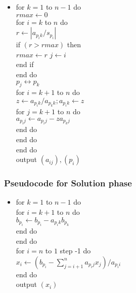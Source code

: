 \documentclass[notheorems,mathserif,table,compress]{beamer}  %
\begin{document}
\begin{frame}
\begin{itemize}
\item 
\textsf{for} $k=1$ \textsf{to} $n−1$ \textsf{do}\\
$rmax\leftarrow 0$\\
\textsf{for} $i=k$ \textsf{to} $n$ \textsf{do}\\
$r\leftarrow|a_{p_ik}/s_{p_{i}}|$\\
if $(r>rmax)$ then\\
$rmax\leftarrow r$\quad
$j\leftarrow i$\\
\textsf{end if}\\
\textsf{end do}\\
$p_j\leftrightarrow p_k$\\
\textsf{for} $i=k+1$ \textsf{to} $n$ \textsf{do}\\
$z\leftarrow a_{p_ik}/a_{p_kk};a_{p_ik}\leftarrow z$\\
\textsf{for} $j=k+1$ \textsf{to} $n$ \textsf{do}\\
$a_{p_ij}\leftarrow a_{p_ij}−za_{p_kj}$\\
\textsf{end do}\\
\textsf{end do}\\
\textsf{end do}\\
\textsf{output} $(a_{ij}),(p_i)$\\
\end{itemize}
\end{frame}

\begin{frame}
\frametitle{Pseudocode for Solution phase} 
\begin{itemize}
\item \textsf{for} $k=1$ \textsf{to} $n−1$ \textsf{do}\\
\textsf{for} $i=k+1$ \textsf{to} $n$ \textsf{do}\\
$b_{p_i}\leftarrow b_{p_i}−a_{p_ik}b_{p_k}$\\
\textsf{end do}\\
\textsf{end do}\\
for $i=n$ to $1$ step -1 do\\
$x_i\leftarrow (b_{p_i}-\sum_{j=i+1}^{n}a_{p_ij}x_j)/a_{p_ii}$\\
\textsf{end do}\\
\textsf{output} $(x_i)$
\end{itemize}
\end{frame}

\begin{frame} 

\end{frame}
\end{document}
